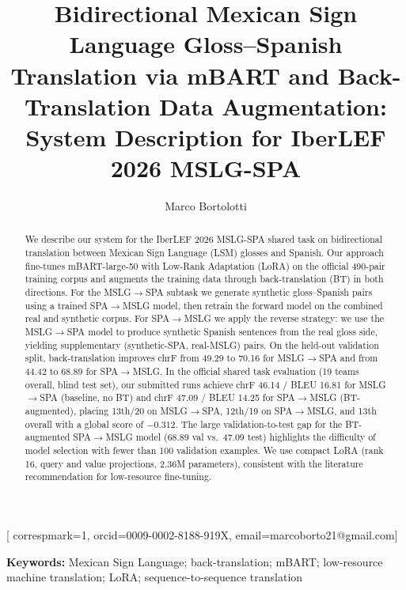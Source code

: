 \documentclass[sigconf,screen]{ceurart}
\begin{document}
\title{Bidirectional Mexican Sign Language Gloss--Spanish Translation
  via mBART and Back-Translation Data Augmentation:
  System Description for IberLEF 2026 MSLG-SPA}

\author[1]{Marco Bortolotti}[%
correspmark=1,
orcid=0009-0002-8188-919X,
email=marcoborto21@gmail.com]
\address[1]{Independent Researcher, Ferrara, Italy}

\maketitle

\begin{abstract}
We describe our system for the IberLEF 2026 MSLG-SPA shared task on
bidirectional translation between Mexican Sign Language (LSM) glosses and
Spanish.
Our approach fine-tunes mBART-large-50 with Low-Rank Adaptation (LoRA)
on the official 490-pair training corpus and augments the training data
through back-translation (BT) in both directions.
For the MSLG$\!\to\!$SPA subtask we generate synthetic gloss--Spanish
pairs using a trained SPA$\!\to\!$MSLG model, then retrain the forward
model on the combined real and synthetic corpus.
For SPA$\!\to\!$MSLG we apply the reverse strategy: we use the
MSLG$\!\to\!$SPA model to produce synthetic Spanish sentences from the
real gloss side, yielding supplementary (synthetic-SPA, real-MSLG) pairs.
On the held-out validation split, back-translation improves chrF from
49.29 to 70.16 for MSLG$\!\to\!$SPA and from 44.42 to 68.89 for
SPA$\!\to\!$MSLG.
In the official shared task evaluation (19 teams overall, blind test set),
our submitted runs achieve chrF 46.14 / BLEU 16.81 for
MSLG$\!\to\!$SPA (baseline, no BT) and chrF 47.09 / BLEU 14.25
for SPA$\!\to\!$MSLG (BT-augmented), placing 13th/20 on
MSLG$\!\to\!$SPA, 12th/19 on SPA$\!\to\!$MSLG, and 13th overall
with a global score of $-0.312$.
The large validation-to-test gap for the BT-augmented SPA$\!\to\!$MSLG
model (68.89 val vs.\ 47.09 test) highlights the difficulty of model
selection with fewer than 100 validation examples.
We use compact LoRA (rank 16, query and value projections, 2.36M
parameters), consistent with the literature recommendation for
low-resource fine-tuning.
\end{abstract}

\noindent\textbf{Keywords:} Mexican Sign Language;
back-translation; mBART; low-resource machine translation;
LoRA; sequence-to-sequence translation
\end{document}
